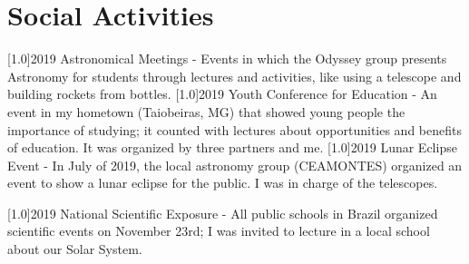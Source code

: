 \documentclass[]{cv-style}
\begin{document}
\section{Social Activities}
    \vspace{-0.2cm}
    \begin{entrylist}
        \entry
            {\scalebox{.8}[1.0]{2019}}
            {Astronomical Meetings - {}}
            {}
            {Events in which the Odyssey group presents Astronomy for students through lectures and activities, like using a telescope and building rockets from bottles.}
        \entry
            {\scalebox{.8}[1.0]{2019}}
            {Youth Conference for Education - {}}
            {}
            {An event in my hometown (Taiobeiras, MG) that showed young people the importance of studying; it counted with lectures about opportunities and benefits of education. It was organized by three partners and me.}
        \entry
            {\scalebox{.8}[1.0]{2019}}
            {Lunar Eclipse Event - {}}
            {}
            {In July of 2019, the local astronomy group (CEAMONTES) organized an event to show a lunar eclipse for the public. I was in charge of the telescopes.}
    \end{entrylist}
\newpage
    \begin{entrylist}
        \entry
            {\scalebox{.8}[1.0]{2019}}
            {National Scientific Exposure - {}}
            {}
            {All public schools in Brazil organized scientific events on November 23rd; I was invited to lecture in a local school about our Solar System.}
    \end{entrylist}
\end{document}
